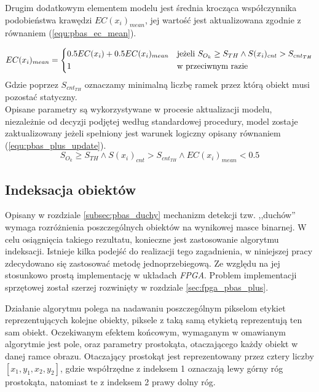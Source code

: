 Drugim dodatkowym elementem modelu jest średnia krocząca współczynnika podobieństwa krawędzi $EC(x_i)_{mean}$, jej wartość jest aktualizowana zgodnie z równaniem (\ref{equ:pbas_ec_mean}).

    \begin{equation}
	    EC(x_i)_{mean} = 
		\begin{dcases}
    		0.5EC(x_i) + 0.5EC(x_i)_{mean} & \text{jeżeli } S_{O_k} \geq  S_{TH} \land S(x_i)_{cnt} > S_{{cnt}_{TH}}	 \\
            1                & \text{w przeciwnym razie}		
		\end{dcases}
	\label{equ:pbas_ec_mean}	
	\end{equation}
\noindent Gdzie poprzez $S_{{cnt}_{TH}}$ oznaczamy minimalną liczbę ramek przez którą obiekt musi pozostać statyczny.
\\
\noindent Opisane parametry są wykorzystywane w procesie aktualizacji modelu, niezależnie od decyzji podjętej według standardowej procedury, model zostaje zaktualizowany jeżeli spełniony jest warunek logiczny opisany równaniem (\ref{equ:pbas_plus_update}).
    \begin{equation}
	    S_{O_k} \geq S_{TH} \land S(x_i)_{cnt} > S_{cnt_{TH}} \land EC(x_i)_{mean} < 0.5
	\label{equ:pbas_plus_update}	
	\end{equation}


\subsection{Indeksacja obiektów}
\label{subsec:pbas_indeksacja}

Opisany w rozdziale \ref{subsec:pbas_duchy} mechanizm detekcji tzw. ,,duchów'' wymaga rozróżnienia poszczególnych obiektów na wynikowej masce binarnej. W celu osiągnięcia takiego rezultatu, konieczne jest zastosowanie algorytmu indeksacji. Istnieje kilka podejść do realizacji tego zagadnienia, w niniejszej pracy zdecydowano się zastosować metodę jednoprzebiegową. Ze względu na jej stosunkowo prostą implementację w układach \textit{FPGA}. Problem implementacji sprzętowej został szerzej rozwinięty w rozdziale \ref{sec:fpga_pbas_plus}. 

Działanie algorytmu polega na nadawaniu poszczególnym pikselom etykiet reprezentujących kolejne obiekty, piksele z taką samą etykietą reprezentują ten sam obiekt. Oczekiwanym efektem końcowym, wymaganym w omawianym algorytmie jest pole, oraz parametry prostokąta, otaczającego każdy obiekt w danej ramce obrazu. Otaczający prostokąt jest reprezentowany przez cztery liczby $[x_1,y_1,x_2,y_2]$, gdzie współrzędne z indeksem 1 oznaczają lewy górny róg prostokąta, natomiast te z indeksem 2 prawy dolny róg. 

